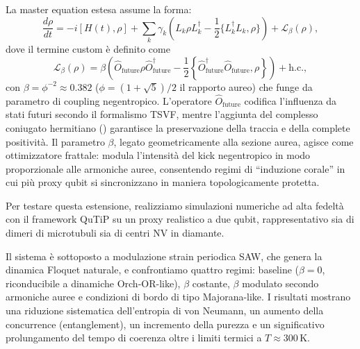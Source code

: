 \documentclass[11pt,a4paper]{article}
\theoremstyle{plain}
\theoremstyle{definition}
\begin{document}
\vspace{0.2cm}

\begin{tcolorbox}[colback=blue!3!white,colframe=blue!80!black,title=Termine retrocausale-negentropico $\mathcal{L}_\beta$]
La master equation estesa assume la forma:
\[
\frac{d\rho}{dt} = -i [H(t),\rho] + \sum_k \gamma_k \left( L_k \rho L_k^\dagger - \frac{1}{2} \{L_k^\dagger L_k, \rho\} \right) + \mathcal{L}_\beta(\rho),
\]
dove il termine custom è definito come
\[
\mathcal{L}_\beta(\rho) = \beta \left( \hat{O}_{\text{future}} \rho \hat{O}_{\text{future}}^\dagger 
- \frac{1}{2} \left\{ \hat{O}_{\text{future}}^\dagger \hat{O}_{\text{future}}, \rho \right\} \right) + \text{h.c.},
\]
con $\beta = \phi^{-2} \approx 0.382$ ($\phi = (1+\sqrt{5})/2$ il rapporto aureo) che funge da parametro di coupling negentropico. L’operatore $\hat{O}_{\text{future}}$ codifica l’influenza da stati futuri secondo il formalismo TSVF, mentre l’aggiunta del complesso coniugato hermitiano () garantisce la preservazione della traccia e della complete positività. Il parametro $\beta$, legato geometricamente alla sezione aurea, agisce come ottimizzatore frattale: modula l’intensità del kick negentropico in modo proporzionale alle armoniche auree, consentendo regimi di “induzione corale” in cui più proxy qubit si sincronizzano in maniera topologicamente protetta.
\end{tcolorbox}

Per testare questa estensione, realizziamo simulazioni numeriche ad alta fedeltà con il framework QuTiP su un proxy realistico a due qubit, rappresentativo sia di dimeri di microtubuli sia di centri NV in diamante. 


\vspace{0.2cm}


Il sistema è sottoposto a modulazione strain periodica SAW, che genera la dinamica Floquet naturale, e confrontiamo quattro regimi: baseline ($\beta=0$, riconducibile a dinamiche Orch-OR-like), $\beta$ costante, $\beta$ modulato secondo armoniche auree e condizioni di bordo di tipo Majorana-like. I risultati mostrano una riduzione sistematica dell’entropia di von Neumann, un aumento della concurrence (entanglement), un incremento della purezza e un significativo prolungamento del tempo di coerenza oltre i limiti termici a $T \approx 300\,\text{K}$.


\vspace{0.2cm}
\end{document}
